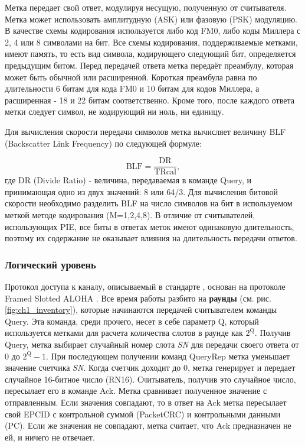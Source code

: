 Метка передает свой ответ, модулируя несущую, полученную от считывателя. Метка может использовать амплитудную (ASK) или фазовую (PSK) модуляцию. В качестве схемы кодирования используется либо код FM0, либо коды Миллера с 2, 4 или 8 символами на бит. Все схемы кодирования, поддерживаемые метками, имеют память, то есть вид символа, кодирующего следующий бит, определяется предыдущим битом. Перед передачей ответа метка передаёт преамбулу, которая может быть обычной или расширенной. Короткая преамбула равна по длительности 6 битам для кода FM0 и 10 битам для кодов Миллера, а расширенная - 18 и 22 битам соответственно. Кроме того, после каждого ответа метки следует символ, не кодирующий ни ноль, ни единицу.

Для вычисления скорости передачи символов метка вычисляет величину BLF (Backscatter Link Frequency) по следующей формуле:

$$
\text{BLF} = \frac{\text{DR}}{\text{TRcal}},
$$
где DR (Divide Ratio) - величина, передаваемая в команде Query, и принимающая одно из двух значений: 8 или 64/3. Для вычисления битовой скорости необходимо разделить BLF на число символов на бит в используемом меткой методе кодирования (M=1,2,4,8). В отличие от считывателей, использующих PIE, все биты в ответах меток имеют одинаковую длительность, поэтому их содержание не оказывает влияния на длительность передачи ответов.



\subsubsection{Логический уровень}\label{sec:ch1_rfid_std_logic}

Протокол доступа к каналу, описываемый в стандарте \cite{StdGen2}, основан на протоколе Framed Slotted ALOHA \cite{Roberts1975, Abramson1970}. Все время работы разбито на \textbf{раунды} (см. рис. \ref{fig:ch1_inventory}), которые начинаются передачей считывателем команды Query. Эта команда, среди прочего, несет в себе параметр Q, который используется метками для расчета количества слотов в раунде как $2^\text{Q}$. Получив Query, метка выбирает случайный номер слота \textit{SN} для передачи своего ответа от 0 до $2^\text{Q}-1$. При последующем получении команд QueryRep метка уменьшает значение счетчика \textit{SN}. Когда счетчик доходит до 0, метка генерирует и передает случайное 16-битное число (RN16). Считыватель, получив это случайное число, пересылает его в команде Ack. Метка сравнивает полученное значение с отправленным. Если значения совпадают, то в ответ на Ack метка пересылает свой EPCID с контрольной суммой (PacketCRC) и контрольными данными (PC). Если же значения не совпадают, метка считает, что Ack предназначен не ей, и ничего не отвечает.

